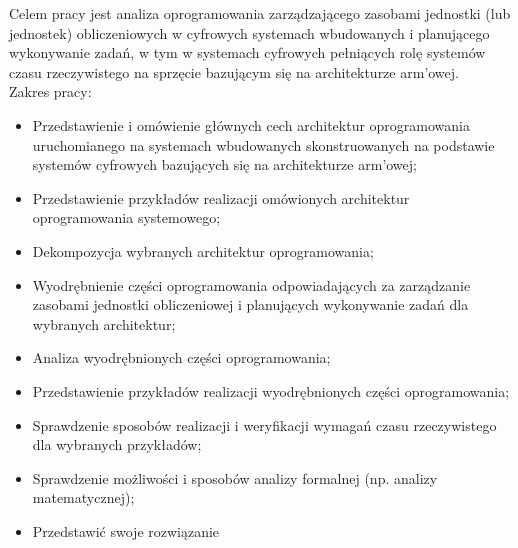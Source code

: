 \documentclass[../../main]{subfiles}
\begin{document}
Celem pracy jest analiza oprogramowania zarządzającego zasobami jednostki (lub jednostek)
obliczeniowych w cyfrowych systemach wbudowanych i planującego wykonywanie zadań, w tym w systemach
cyfrowych pełniących rolę systemów czasu rzeczywistego na sprzęcie bazującym się na architekturze
\acrshort{arm}'owej.\\
Zakres pracy:
\begin{itemize}
    \item Przedstawienie i omówienie głównych cech architektur oprogramowania uruchomianego na systemach wbudowanych skonstruowanych na podstawie systemów cyfrowych bazujących się na architekturze \acrshort{arm}'owej;
    \item Przedstawienie przykładów realizacji omówionych architektur oprogramowania systemowego;
    \item Dekompozycja wybranych architektur oprogramowania;
    \item Wyodrębnienie części oprogramowania odpowiadających za zarządzanie zasobami jednostki obliczeniowej i planujących wykonywanie zadań dla wybranych architektur;
    \item Analiza wyodrębnionych części oprogramowania;
    \item Przedstawienie przykładów realizacji wyodrębnionych części oprogramowania;
    \item Sprawdzenie sposobów realizacji i weryfikacji wymagań czasu rzeczywistego dla wybranych przykładów;
    \item Sprawdzenie możliwości i sposobów analizy formalnej (np. analizy matematycznej);
    \item Przedstawić swoje rozwiązanie %
\end{itemize}
\end{document}
